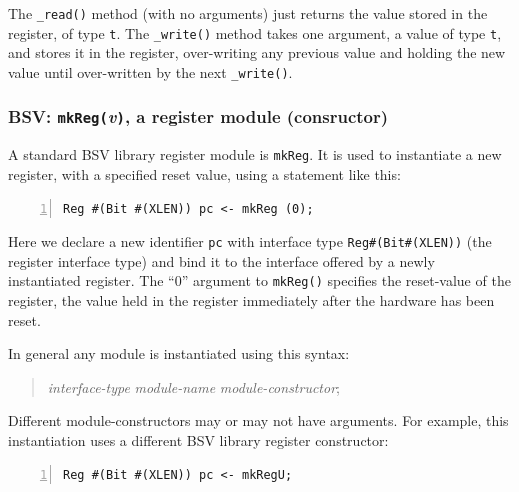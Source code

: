 The \verb|_read()| method (with no arguments) just returns the value
stored in the register, of type \verb|t|.  The \verb|_write()| method
takes one argument, a value of type \verb|t|, and stores it in the
register, over-writing any previous value and holding the new value
until over-written by the next \verb|_write()|.


\subsubsection{BSV: {\tt mkReg(}\emph{v}{\tt )}, a register module (consructor)}



A standard BSV library register module is \verb|mkReg|.  It is used to
instantiate a new register, with a specified reset value, using a
statement like this:


\begin{Verbatim}[frame=single, numbers=left]
    Reg #(Bit #(XLEN)) pc <- mkReg (0);
\end{Verbatim}

Here we declare a new identifier \verb|pc| with interface type
\verb|Reg#(Bit#(XLEN))| (the register interface type) and bind it to
the interface offered by a newly instantiated register.  The ``0''
argument to \verb|mkReg()| specifies the reset-value of the register,
{\ie} the value held in the register immediately after the hardware
has been reset.


In general any module is instantiated using this syntax:

\begin{quote}
\emph{interface-type} \hm \emph{module-name} \hm {\tt <-} \hm \emph{module-constructor};
\end{quote}

Different module-constructors may or may not have arguments.  For
example, this instantiation uses a different BSV library register
constructor:


\begin{Verbatim}[frame=single, numbers=left]
    Reg #(Bit #(XLEN)) pc <- mkRegU;
\end{Verbatim}

